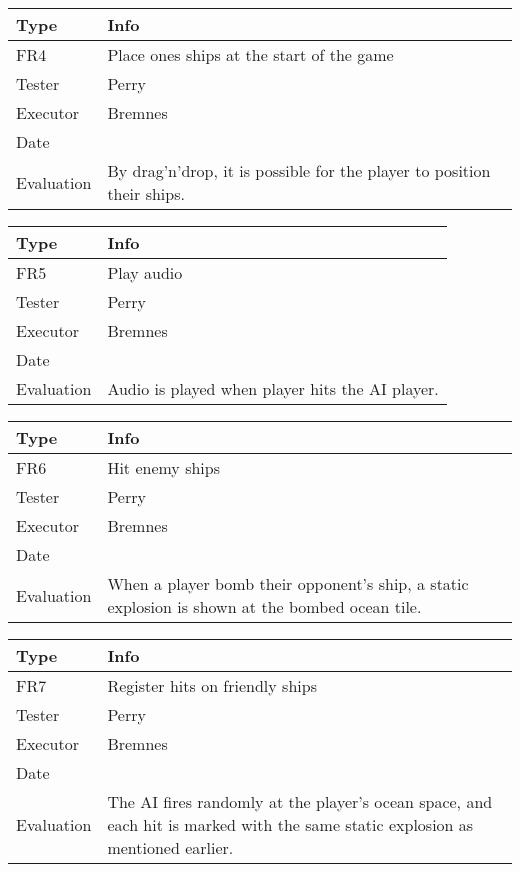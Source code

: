 \vspace{0.5em}

\noindent
\begin{tabular}{|p{2cm}|p{10cm}|}
	\hline
	\bf{Type}	& \bf{Info} \\
	\hline
	FR4			& Place ones ships at the start of the game \\
	Tester		& Perry \\
	Executor	& Bremnes \\
	Date		& \date{\today} \\
	Evaluation	& By drag'n'drop, it is possible for the player to position their ships. \\
	\hline
\end{tabular}

\vspace{0.5em}

\noindent
\begin{tabular}{|p{2cm}|p{10cm}|}
	\hline
	\bf{Type}	& \bf{Info} \\
	\hline
	FR5			& Play audio \\
	Tester		& Perry \\
	Executor	& Bremnes \\
	Date		& \date{\today} \\
	Evaluation	& Audio is played when player hits the AI player. \\
	\hline
\end{tabular}

\vspace{0.5em}

\noindent
\begin{tabular}{|p{2cm}|p{10cm}|}
	\hline
	\bf{Type}	& \bf{Info} \\
	\hline
	FR6			& Hit enemy ships \\
	Tester		& Perry \\
	Executor	& Bremnes \\
	Date		& \date{\today} \\
	Evaluation	& When a player bomb their opponent's ship, a static explosion is shown at the bombed ocean tile. \\
	\hline
\end{tabular}

\vspace{0.5em}

\noindent
\begin{tabular}{|p{2cm}|p{10cm}|}
	\hline
	\bf{Type}	& \bf{Info} \\
	\hline
	FR7			& Register hits on friendly ships \\
	Tester		& Perry \\
	Executor	& Bremnes \\
	Date		& \date{\today} \\
	Evaluation	& The AI fires randomly at the player's ocean space, and each hit is marked with the same static explosion as mentioned earlier. \\
	\hline
\end{tabular}


